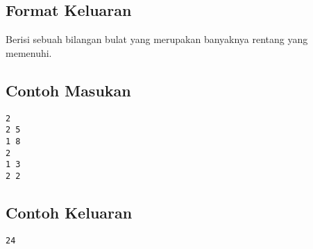 \documentclass{article}
\begin{document}
\subsection*{Format Keluaran}
Berisi sebuah bilangan bulat yang merupakan banyaknya rentang yang memenuhi.
\\

\begin{multicols}{2}
\subsection*{Contoh Masukan}
\begin{lstlisting}
2
2 5
1 8
2
1 3
2 2
\end{lstlisting}
\columnbreak
\subsection*{Contoh Keluaran}
\begin{lstlisting}
24
\end{lstlisting}
\vfill
\null
\end{multicols}


\pagebreak
\end{document}
